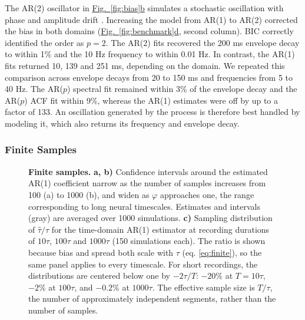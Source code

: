 \documentclass[pdflatex,lineno,sn-nature]{sn-jnl}
\newcommand{\figpanel}[3][]{\hyperref[#2]{Fig.~#1\ref*{#2}#3}}
\theoremstyle{thmstyleone}
\theoremstyle{thmstyletwo}
\theoremstyle{thmstylethree}
\begin{document}
The AR(2) oscillator in \figpanel{fig:bias}{b} simulates a stochastic oscillation with phase and amplitude drift \cite{stralrowski_charts_1970, feingold_bursts_2015}. Increasing the model from AR(1) to AR(2) corrected the bias in both domains (\figpanel{fig:benchmark}{d}, second column). BIC correctly identified the order as $p=2$. The AR(2) fits recovered the 200 ms envelope decay to within 1\% and the 10 Hz frequency to within 0.01 Hz. In contrast, the AR(1) fits returned 10, 139 and 251 ms, depending on the domain. We repeated this comparison across envelope decays from 20 to 150 ms and frequencies from 5 to 40 Hz. The AR($p$) spectral fit remained within 3\% of the envelope decay and the AR($p$) ACF fit within 9\%, whereas the AR(1) estimates were off by up to a factor of 133. An oscillation generated by the process is therefore best handled by modeling it, which also returns its frequency and envelope decay.

\subsubsection{Finite Samples}\label{sec:finite}

\begin{figure}[htbp]
\centering

\caption{\textbf{Finite samples.} \textbf{a, b)} Confidence intervals around the estimated AR(1) coefficient narrow as the number of samples increases from 100 (a) to 1000 (b), and widen as $\varphi$ approaches one, the range corresponding to long neural timescales. Estimates and intervals (gray) are averaged over 1000 simulations. \textbf{c)} Sampling distribution of $\hat\tau/\tau$ for the time-domain AR(1) estimator at recording durations of $10\tau$, $100\tau$ and $1000\tau$ (150 simulations each). The ratio is shown because bias and spread both scale with $\tau$ (eq. \ref{eq:finite}), so the same panel applies to every timescale. For short recordings, the distributions are centered below one by $-2\tau/T$: $-20\%$ at $T = 10\tau$, $-2\%$ at $100\tau$, and $-0.2\%$ at $1000\tau$. The effective sample size is $T/\tau$, the number of approximately independent segments, rather than the number of samples.}
\label{fig:finite}
\end{figure}
\end{document}
